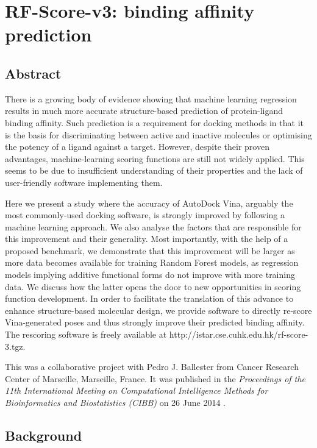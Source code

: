 \chapter{RF-Score-v3: binding affinity prediction}

\section{Abstract}

There is a growing body of evidence showing that machine learning regression results in much more accurate structure-based prediction of protein-ligand binding affinity. Such prediction is a requirement for docking methods in that it is the basis for discriminating between active and inactive molecules or optimising the potency of a ligand against a target. However, despite their proven advantages, machine-learning scoring functions are still not widely applied. This seems to be due to insufficient understanding of their properties and the lack of user-friendly software implementing them.

Here we present a study where the accuracy of AutoDock Vina, arguably the most commonly-used docking software, is strongly improved by following a machine learning approach. We also analyse the factors that are responsible for this improvement and their generality. Most importantly, with the help of a proposed benchmark, we demonstrate that this improvement will be larger as more data becomes available for training Random Forest models, as regression models implying additive functional forms do not improve with more training data. We discuss how the latter opens the door to new opportunities in scoring function development. In order to facilitate the translation of this advance to enhance structure-based molecular design, we provide software to directly re-score Vina-generated poses and thus strongly improve their predicted binding affinity. The rescoring software is freely available at http://istar.cse.cuhk.edu.hk/rf-score-3.tgz.

This was a collaborative project with Pedro J. Ballester from Cancer Research Center of Marseille, Marseille, France. It was published in the \textit{Proceedings of the 11th International Meeting on Computational Intelligence Methods for Bioinformatics and Biostatistics (CIBB)} on 26 June 2014 \citep{1433}.

\section{Background}


